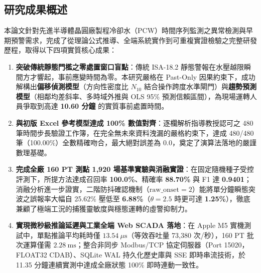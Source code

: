 \documentclass[fontset=none, a4paper, 12pt]{ctexart}
\begin{document}
\begin{doublespace}
\subsection{研究成果概述}
本論文針對先進半導體晶圓廠製程冷卻水（PCW）時間序列監測之異常檢測與早期預警需求，完成了從理論公式推導、全端系統實作到可重複實證檢驗之完整研發歷程，取得以下四項實質核心成果：
\begin{enumerate}
    \item \textbf{突破傳統靜態門檻之零處置窗口盲點}：傳統 ISA-18.2 靜態警報在水壓越限瞬間方才響起，事前應變時間為零。本研究嚴格在 Past-Only 因果約束下，成功解構出\textbf{偏移偵測模型}（方向性密度比 $N_{10}$ 結合操作跨度水準閘門）與\textbf{趨勢預測模型}（相鄰均差斜率、多時域外推與 OLS 95\% 預測信賴區間），為現場運轉人員爭取到高達 \textbf{10.60 分鐘} 的實質事前處置時間。
    \item \textbf{與初版 Excel 參考模型達成 100\% 數值對齊}：逐欄解析指導教授認可之 480 筆時間步長驗證工作簿，在完全無未來資料洩漏的嚴格約束下，達成 480/480 筆（100.00\%）全數精確吻合，最大絕對誤差為 0.0，奠定了演算法落地的嚴謹數理基礎。
    \item \textbf{完成全廠 160 PT 測點 1,920 場基準實驗與消融實證}：在固定隨機種子受控評測下，所提方法達成召回率 \textbf{100.0\%}、精確率 \textbf{88.70\%} 與 F1 達 \textbf{0.9401}；消融分析進一步證實，二階防抖確認機制（$\text{raw\_onset}=2$）能將單分鐘瞬態突波之誤報率大幅自 25.62\% 壓低至 \textbf{6.88\%}（$\theta=2.5$ 時更可達 \textbf{1.25\%}），徹底兼顧了極端工況的捕獲靈敏度與穩態運轉的虛警抑制力。
    \item \textbf{實現微秒級推論延遲與工業全端 Web SCADA 落地}：在 Apple M5 實機測試中，單點推論平均耗時僅 \textbf{$13.54\ \mu\mathrm{s}$}（等效吞吐量 73,380 次/秒），160 PT 批次運算僅需 \textbf{$2.28\ \mathrm{ms}$}；整合非同步 Modbus/TCP 協定伺服器（Port 15020，FLOAT32 CDAB）、SQLite WAL 持久化歷史庫與 SSE 即時串流技術，於 11.35 分鐘連續實測中達成全廠狀態 100\% 即時連動一致性。
\end{enumerate}


\end{doublespace}
\end{document}
